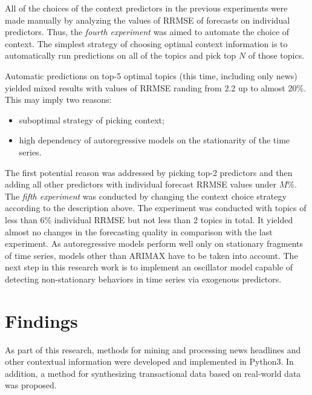 \documentclass[13pt, a4paper]{article}
\begin{document}
\newpage

All of the choices of the context predictors in the previous experiments were made manually by analyzing the values of RRMSE of forecasts on individual predictors. Thus, the \textit{fourth experiment} was aimed to automate the choice of context. The simplest strategy of choosing optimal context information is to automatically run predictions on all of the topics and pick top $N$ of those topics.

Automatic predictions on top-5 optimal topics (this time, including only news) yielded mixed results with values of RRMSE randing from 2.2 up to almost 20\%. This may imply two reasons:
\begin{itemize}
	\item suboptimal strategy of picking context;
	\item high dependency of autoregressive models on the stationarity of the time series.
\end{itemize}

The first potential reason was addressed by picking top-2 predictors and then adding all other predictors with individual forecast RRMSE values under $M$\%. The \textit{fifth experiment} was conducted by changing the context choice strategy according to the description above. The experiment was conducted with topics of less than 6\% individual RRMSE but not less than 2 topics in total. It yielded almost no changes in the forecasting quality in comparison with the last experiment. As autoregressive models perform well only on stationary fragments of time series, models other than ARIMAX have to be taken into account. The next step in this research work is to implement an oscillator model capable of detecting non-stationary behaviors in time series via exogenous predictors.

\clearpage

\section{Findings} \label{f}

As part of this research, methods for mining and processing news headlines and other contextual information were developed and implemented in Python3. In addition, a method for synthesizing transactional data based on real-world data was proposed. 
\end{document}
